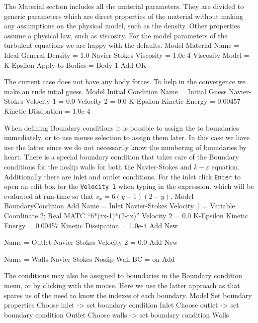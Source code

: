 The Material section includes all the material parameters.
They are divided to generic parameters which are direct properties of the material
without making any assumptions on the physical model, such as the density. Other properties assume
a physical law, such as viscosity. For the model parameters of the turbulent equations we are 
happy with the defaults. 
\ttbegin
Model
  Material
    Name = Ideal
    General 
      Density = 1.0
    Navier-Stokes 
      Viscosity = 1.0e-4
      Viscosity Model = K-Epsilon
    Apply to Bodies = Body 1 
    Add
    OK
\ttend

The current case does not have any body forces. To help in the convergence we make 
an rude intial guess.
\ttbegin
Model
  Initial Condition 
    Name = Initial Guess
    Navier-Stokes
      Velocity 1 = 0.0
      Velocity 2 = 0.0
    K-Epsilon
      Kinetic Energy = 0.00457
      Kinetic Dissipation = 1.0e-4
\ttend

When defining Boundary conditions it is possible to assign the to boundaries immediately, or to use mouse
selection to assign them later. In this case we have use the latter since we do not necessarily know 
the numbering of boundaries by heart.
There is a special boundary condition that takes care of the 
Boundary conditions for the noslip walls for both the Navier-Stokes and
$k-\varepsilon$ equation. Additionally there are inlet and outlet conditions. 
For the inlet click \texttt{Enter} to open an edit box for the \texttt{Velocity 1} when typing in the expression.
which will be evaluated at run-time so that $v_x=6(y-1)(2-y)$. 
\ttbegin
Model
  BoundaryCondition
    Add 
    Name = Inlet
    Navier-Stokes 
      Velocity 1 = Variable Coordinate 2; Real MATC ``6*(tx-1)*(2-tx)''
      Velocity 2 = 0.0
    K-Epsilon
      Kinetic Energy = 0.00457
      Kinetic Dissipation = 1.0e-4
    Add
    New

    Name = Outlet
    Navier-Stokes 
      Velocity 2 = 0.0
    Add 
    New
 
    Name = Walls
    Navier-Stokes 
      Noslip Wall BC = on
    Add
\ttend   

The conditions may also be assigned to boundaries in the Boundary condition menu, or 
by clicking with the mouse. Here we use the latter approach as that spares us of the 
need to know the indexes of each boundary.
\ttbegin
Model
  Set boundary properties
    Choose inlet -> set boundary condition Inlet
    Choose outlet -> set boundary condition Outlet
    Choose walls -> set boundary condition Walls
\ttend

